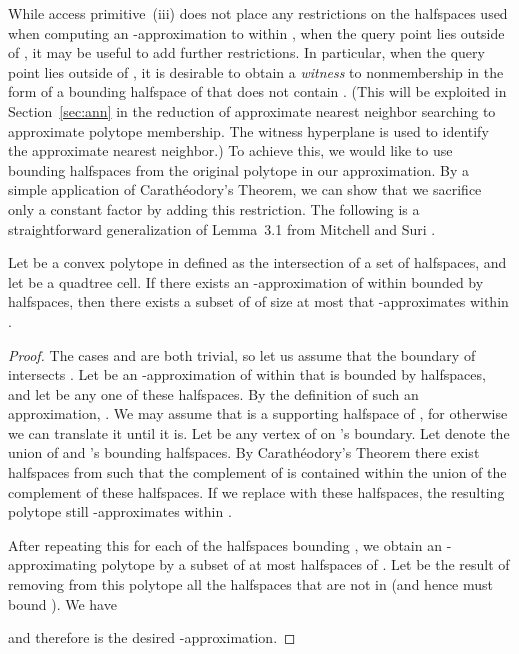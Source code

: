 \documentclass[11pt]{article}   \usepackage[letterpaper,hmargin=2.1cm,vmargin=3cm]{geometry}
\begin{document}
While access primitive~(iii) does not place any restrictions on the halfspaces used when computing an -approximation to  within , when the query point  lies outside of , it may be useful to add further restrictions. In particular, when the query point lies outside of , it is desirable to obtain a \emph{witness} to nonmembership in the form of a bounding halfspace of  that does not contain . (This will be exploited in Section~\ref{sec:ann} in the reduction of approximate nearest neighbor searching to approximate polytope membership. The witness hyperplane is used to identify the approximate nearest neighbor.) To achieve this, we would like to use bounding halfspaces from the original polytope in our approximation. By a simple application of Carath\'{e}odory's Theorem, we can show that we sacrifice only a constant factor by adding this restriction. The following is a straightforward generalization of Lemma~{3.1} from Mitchell and Suri \cite{MS}. 

\begin{lemma} \label{lem:discrete-apx}
Let  be a convex polytope in  defined as the intersection of a set  of halfspaces, and let  be a quadtree cell. If there exists an -approximation of  within  bounded by  halfspaces, then there exists a subset of  of size at most  that -approximates  within . 
\end{lemma}


\begin{proof}
The cases  and  are both trivial, so let us assume that the boundary of  intersects . Let  be an -approximation of  within  that is bounded by  halfspaces, and let  be any one of these halfspaces. By the definition of  such an approximation, . We may assume that  is a supporting halfspace of , for otherwise we can translate it until it is. Let  be any vertex of  on 's boundary. Let  denote the union of  and 's bounding halfspaces. By Carath\'{e}odory's Theorem there exist  halfspaces from  such that the complement of  is contained within the union of the complement of these  halfspaces. If we replace  with these  halfspaces, the resulting polytope still -approximates  within . 

After repeating this for each of the  halfspaces bounding , we obtain an -approximating polytope by a subset of at most  halfspaces of . Let  be the result of removing from this polytope all the halfspaces that are not in  (and hence must bound ). We have

and therefore  is the desired -approximation.
\end{proof}
\end{document}
